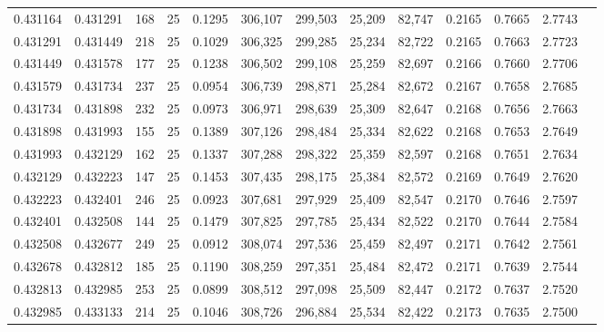 \begin{tabular}{rrrrrrrrrrrrr}
0.431164 & 0.431291 &   168 &  25 &                                     0.1295 & 306,107 & 299,503 &  25,209 &  82,747 & 0.2165 & 0.7665 & 2.7743 \\
0.431291 & 0.431449 &   218 &  25 &                                     0.1029 & 306,325 & 299,285 &  25,234 &  82,722 & 0.2165 & 0.7663 & 2.7723 \\
0.431449 & 0.431578 &   177 &  25 &                                     0.1238 & 306,502 & 299,108 &  25,259 &  82,697 & 0.2166 & 0.7660 & 2.7706 \\
0.431579 & 0.431734 &   237 &  25 &                                     0.0954 & 306,739 & 298,871 &  25,284 &  82,672 & 0.2167 & 0.7658 & 2.7685 \\
0.431734 & 0.431898 &   232 &  25 &                                     0.0973 & 306,971 & 298,639 &  25,309 &  82,647 & 0.2168 & 0.7656 & 2.7663 \\
0.431898 & 0.431993 &   155 &  25 &                                     0.1389 & 307,126 & 298,484 &  25,334 &  82,622 & 0.2168 & 0.7653 & 2.7649 \\
0.431993 & 0.432129 &   162 &  25 &                                     0.1337 & 307,288 & 298,322 &  25,359 &  82,597 & 0.2168 & 0.7651 & 2.7634 \\
0.432129 & 0.432223 &   147 &  25 &                                     0.1453 & 307,435 & 298,175 &  25,384 &  82,572 & 0.2169 & 0.7649 & 2.7620 \\
0.432223 & 0.432401 &   246 &  25 &                                     0.0923 & 307,681 & 297,929 &  25,409 &  82,547 & 0.2170 & 0.7646 & 2.7597 \\
0.432401 & 0.432508 &   144 &  25 &                                     0.1479 & 307,825 & 297,785 &  25,434 &  82,522 & 0.2170 & 0.7644 & 2.7584 \\
0.432508 & 0.432677 &   249 &  25 &                                     0.0912 & 308,074 & 297,536 &  25,459 &  82,497 & 0.2171 & 0.7642 & 2.7561 \\
0.432678 & 0.432812 &   185 &  25 &                                     0.1190 & 308,259 & 297,351 &  25,484 &  82,472 & 0.2171 & 0.7639 & 2.7544 \\
0.432813 & 0.432985 &   253 &  25 &                                     0.0899 & 308,512 & 297,098 &  25,509 &  82,447 & 0.2172 & 0.7637 & 2.7520 \\
0.432985 & 0.433133 &   214 &  25 &                                     0.1046 & 308,726 & 296,884 &  25,534 &  82,422 & 0.2173 & 0.7635 & 2.7500 \\

\end{tabular}

